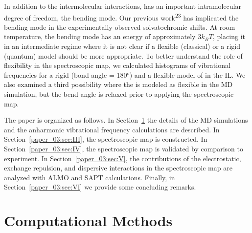 \documentclass[]{article}
\begin{document}
In addition to the intermolecular interactions,  has an important intramolecular degree of freedom, the bending mode. Our previous work\textsuperscript{23} has implicated the bending mode in the experimentally observed solvatochromic shifts. At room temperature, the bending mode has an energy of approximately \(3k_{B}T\), placing it in an intermediate regime where it is not clear if a flexible (classical) or a rigid (quantum) model should be more appropriate. To better understand the role of  flexibility in the spectroscopic map, we calculated histograms of vibrational frequencies for a rigid (bond angle = \ang{180}) and a flexible model of  in the \ce{[C4C1im][PF6]} IL. We also examined a third possibility where the  is modeled as flexible in the MD simulation, but the bend angle is relaxed prior to applying the spectroscopic map.

The paper is organized as follows. In Section~\ref{paper_03:sec:II} the details of the MD simulations and the anharmonic vibrational frequency calculations are described. In Section~\ref{paper_03:sec:III}, the spectroscopic map is constructed. In Section~\ref{paper_03:sec:IV}, the spectroscopic map is validated by comparison to experiment. In Section~\ref{paper_03:sec:V}, the contributions of the electrostatic, exchange repulsion, and dispersive interactions in the spectroscopic map are analyzed with ALMO and SAPT calculations. Finally, in Section~\ref{paper_03:sec:VI} we provide some concluding remarks.

\section{Computational Methods}
\label{paper_03:sec:II}
\end{document}
